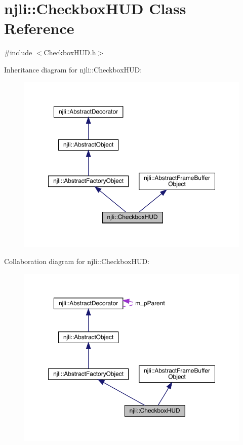 \hypertarget{classnjli_1_1_checkbox_h_u_d}{}\section{njli\+:\+:Checkbox\+H\+UD Class Reference}
\label{classnjli_1_1_checkbox_h_u_d}


{\ttfamily \#include $<$Checkbox\+H\+U\+D.\+h$>$}



Inheritance diagram for njli\+:\+:Checkbox\+H\+UD\+:\nopagebreak
\begin{figure}[H]
\begin{center}
\leavevmode
\includegraphics[width=350pt]{classnjli_1_1_checkbox_h_u_d__inherit__graph}
\end{center}
\end{figure}


Collaboration diagram for njli\+:\+:Checkbox\+H\+UD\+:\nopagebreak
\begin{figure}[H]
\begin{center}
\leavevmode
\includegraphics[width=350pt]{classnjli_1_1_checkbox_h_u_d__coll__graph}
\end{center}
\end{figure}
